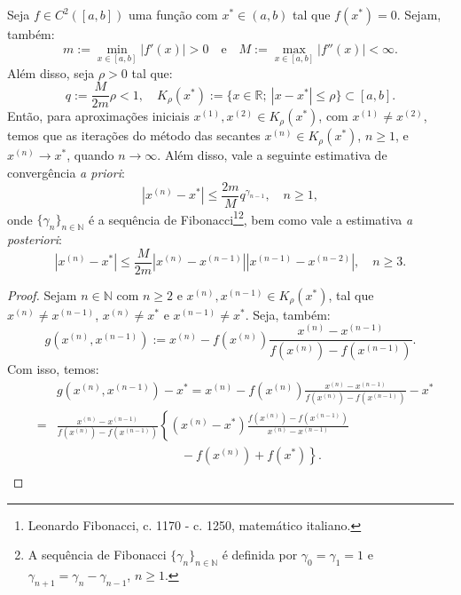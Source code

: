 \begin{ex}
\begin{teo}\label{teo:metodo_das_secantes}
  Seja $f\in C^2([a, b])$ uma função com $x^*\in (a, b)$ tal que $f(x^*) = 0$. Sejam, também:
  \begin{equation}
    m := \min_{x\in [a, b]} |f'(x)| > 0\quad\text{e}\quad M := \max_{x\in [a,b]} |f''(x)| < \infty.
  \end{equation}
Além disso, seja $\rho > 0$ tal que:
\begin{equation}
  q := \frac{M}{2m}\rho < 1,\quad K_\rho(x^*) := \{x\in\mathbb{R};~|x-x^*|\leq \rho\}\subset [a, b].
\end{equation}
Então, para aproximações iniciais $x^{(1)}, x^{(2)}\in K_\rho(x^*)$, com $x^{(1)}\neq x^{(2)}$, temos que as iterações do método das secantes $x^{(n)}\in K_\rho(x^*)$, $n\geq 1$, e $x^{(n)}\to x^*$, quando $n\to\infty$. Além disso, vale a seguinte estimativa de convergência \emph{a priori}:
\begin{equation}
  |x^{(n)} - x^*| \leq \frac{2m}{M}q^{\gamma_{n-1}},\quad n\geq 1,
\end{equation}
onde $\{\gamma_n\}_{n\in\mathbb{N}}$ é a sequência de Fibonacci\footnote{Leonardo Fibonacci, c. 1170 - c. 1250, matemático italiano.}\footnote{A sequência de Fibonacci $\{\gamma_n\}_{n\in\mathbb{N}}$ é definida por $\gamma_0 = \gamma_1 = 1$ e $\gamma_{n+1} = \gamma_{n} - \gamma_{n-1}$, $n\geq 1$.}, bem como vale a estimativa \emph{a posteriori}:
\begin{equation}
  |x^{(n)} - x^*| \leq \frac{M}{2m}|x^{(n)}-x^{(n-1)}||x^{(n-1)}-x^{(n-2)}|,\quad n\geq 3.
\end{equation}
\end{teo}
\begin{proof}
  Sejam $n\in\mathbb{N}$ com $n\geq 2$ e $x^{(n)}, x^{(n-1)}\in K_\rho(x^*)$, tal que $x^{(n)}\neq x^{(n-1)}$, $x^{(n)}\neq x^*$ e $x^{(n-1)}\neq x^*$. Seja, também:
  \begin{equation}
    g(x^{(n)},x^{(n-1)}) := x^{(n)} - f(x^{(n)})\frac{x^{(n)} - x^{(n-1)}}{f(x^{(n)}) - f(x^{(n-1)})}.
  \end{equation}
Com isso, temos:
  \begin{eqnarray}
    &&g(x^{(n)},x^{(n-1)}) - x^* = x^{(n)} - f(x^{(n)})\frac{x^{(n)} - x^{(n-1)}}{f(x^{(n)}) - f(x^{(n-1)})} - x^*\\
    &=& \frac{x^{(n)} - x^{(n-1)}}{f(x^{(n)}) - f(x^{(n-1)})}\left\{(x^{(n)} - x^*)\frac{f(x^{(n)}) - f(x^{(n-1)})}{x^{(n)} - x^{(n-1)}}\right.\\ &\ &\qquad\qquad\qquad\qquad\qquad -\left. f(x^{(n)}) + f(x^*)\right\}.\\

\end{eqnarray}
\end{proof}
\end{ex}
